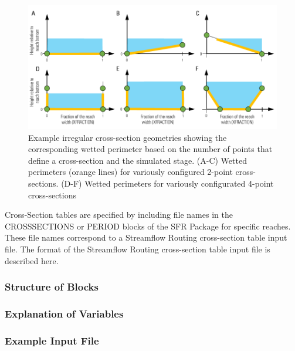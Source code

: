 \begin{figure}[ht]
	\centering
	\includegraphics[scale=1.0]{../Figures/n-point-cross-section-wetted-perimeter}
	\caption[Illustrations of variously defined n-point cross-sections that show how wetted perimeter will vary depending on the stage and the number of points used to define the cross-section]{Example irregular cross-section geometries showing the corresponding wetted perimeter based on the number of points that define a cross-section and the simulated stage.  (A-C) Wetted perimeters (orange lines) for variously configured 2-point cross-sections.  (D-F) Wetted perimeters for variously configurated 4-point cross-sections}
	\label{fig:sfr-n-point-wp}
\end{figure}

Cross-Section tables are specified by including file names in the CROSSSECTIONS or PERIOD blocks of the SFR Package for specific reaches.  These file names correspond to a Streamflow Routing cross-section table input file.  The format of the Streamflow Routing cross-section table input file is described here.

\vspace{5mm}
\subsubsection{Structure of Blocks}
\vspace{5mm}



\vspace{5mm}

\vspace{5mm}
\subsubsection{Explanation of Variables}
\begin{description}

\end{description}

\subsubsection{Example Input File}


